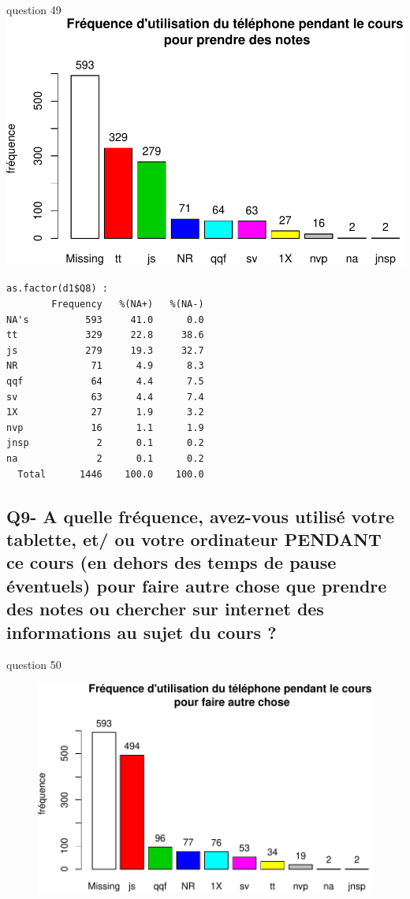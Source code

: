 \documentclass[]{article}
\begin{document}
question 49
\includegraphics{qs_etudiants_files/figure-latex/utilisatin3-1.pdf}

\begin{verbatim}
as.factor(d1$Q8) : 
        Frequency   %(NA+)   %(NA-)
NA's          593     41.0      0.0
tt            329     22.8     38.6
js            279     19.3     32.7
NR             71      4.9      8.3
qqf            64      4.4      7.5
sv             63      4.4      7.4
1X             27      1.9      3.2
nvp            16      1.1      1.9
jnsp            2      0.1      0.2
na              2      0.1      0.2
  Total      1446    100.0    100.0
\end{verbatim}

\subsection{Q9- A quelle fréquence, avez-vous utilisé votre tablette,
et/ ou votre ordinateur PENDANT ce cours (en dehors des temps de pause
éventuels) pour faire autre chose que prendre des notes ou chercher sur
internet des informations au sujet du cours
?}\label{q9--a-quelle-frequence-avez-vous-utilise-votre-tablette-et-ou-votre-ordinateur-pendant-ce-cours-en-dehors-des-temps-de-pause-eventuels-pour-faire-autre-chose-que-prendre-des-notes-ou-chercher-sur-internet-des-informations-au-sujet-du-cours}

question 50

\begin{figure}[htbp]
\centering
\includegraphics{qs_etudiants_files/figure-latex/utilisation4-1.pdf}
\end{figure}
\end{document}

